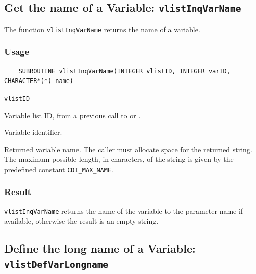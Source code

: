 \subsection{Get the name of a Variable: \texttt{vlistInqVarName}}
\label{vlistInqVarName}

The function {\texttt{vlistInqVarName}} returns the name of a variable.

\subsubsection*{Usage}

\begin{verbatim}
    SUBROUTINE vlistInqVarName(INTEGER vlistID, INTEGER varID, CHARACTER*(*) name)
\end{verbatim}

\hspace*{4mm}\begin{minipage}[]{15cm}
\begin{deflist}{\texttt{vlistID}\ }
\item[\texttt{vlistID}]
Variable list ID, from a previous call to {} or {}.
\item[\texttt{varID}]
Variable identifier.
\item[\texttt{name}]
Returned variable name. The caller must allocate space for the
                    returned string. The maximum possible length, in characters, of
                    the string is given by the predefined constant {\texttt{CDI\_MAX\_NAME}}.

\end{deflist}
\end{minipage}

\subsubsection*{Result}

{\texttt{vlistInqVarName}} returns the name of the variable to the parameter name if available,
otherwise the result is an empty string.



\subsection{Define the long name of a Variable: \texttt{vlistDefVarLongname}}
\label{vlistDefVarLongname}

